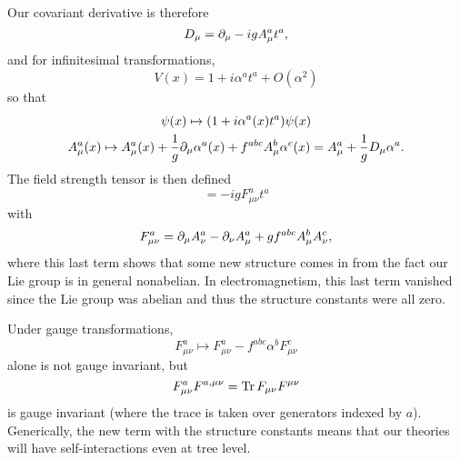 Our covariant derivative is therefore
\begin{equation}
    D_\mu=\partial_\mu -ig A_\mu^a t^a,
\end{equation}
and for infinitesimal transformations,
\begin{equation}
    V(x)=1+i\alpha^a t^a +O(\alpha^2)
\end{equation}
so that
\begin{gather}
    \psi(x) \mapsto (1+i\alpha^a(x) t^a) \psi(x)\\
    A_\mu^a(x) \mapsto A_\mu^a(x) +\frac{1}{g} \partial_\mu \alpha^a(x) +f^{abc}A_\mu^b \alpha^c(x) = A_\mu^a+ \frac{1}{g} D_\mu \alpha^a.
\end{gather}
The field strength tensor is then defined
\begin{equation}
    [D_\mu,D_\nu]=-ig F_{\mu\nu}^a t^a
\end{equation}
with
\begin{equation}
    F_{\mu\nu}^a = \partial_\mu A_\nu^a - \partial_\nu A_\mu^a +g f^{abc}A_\mu^b A_\nu^c,
\end{equation}
where this last term shows that some new structure comes in from the fact our Lie group is in general nonabelian. In electromagnetism, this last term vanished since the Lie group was abelian and thus the structure constants were all zero.

Under gauge transformations,
\begin{equation}
    F_{\mu\nu}^a \mapsto F_{\mu\nu}^a - f^{abc}\alpha^b F_{\mu\nu}^c
\end{equation}
alone is not gauge invariant, but
\begin{equation}
    F_{\mu\nu}^a F^{a,\mu\nu} = \operatorname{Tr} F_{\mu\nu} F^{\mu\nu}
\end{equation}
is gauge invariant (where the trace is taken over generators indexed by $a$). Generically, the new term with the structure constants means that our theories will have self-interactions even at tree level.


